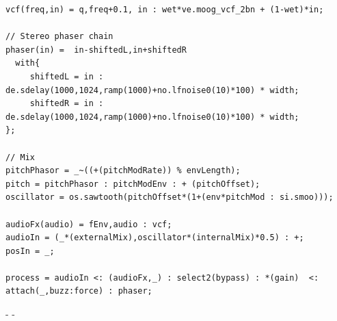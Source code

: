 \documentclass[sigconf]{nimeart}
\begin{document}
\begin{Verbatim}[breaklines=true,breakanywhere=true,fontsize=\footnotesize]
vcf(freq,in) = q,freq+0.1, in : wet*ve.moog_vcf_2bn + (1-wet)*in; 

// Stereo phaser chain
phaser(in) =  in-shiftedL,in+shiftedR
  with{
     shiftedL = in : de.sdelay(1000,1024,ramp(1000)+no.lfnoise0(10)*100) * width;
     shiftedR = in : de.sdelay(1000,1024,ramp(1000)+no.lfnoise0(10)*100) * width;
};

// Mix 
pitchPhasor = _~((+(pitchModRate)) % envLength);
pitch = pitchPhasor : pitchModEnv : + (pitchOffset);
oscillator = os.sawtooth(pitchOffset*(1+(env*pitchMod : si.smoo)));

audioFx(audio) = fEnv,audio : vcf;
audioIn = (_*(externalMix),oscillator*(internalMix)*0.5) : +;
posIn = _;  

process = audioIn <: (audioFx,_) : select2(bypass) : *(gain)  <: attach(_,buzz:force) : phaser;
\end{Verbatim}

- -



\end{document}
